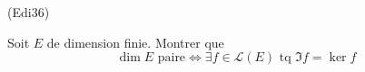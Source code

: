 \begin{tiny}(Edi36)\end{tiny} Soit $E$ de dimension finie. Montrer que
\begin{displaymath}
\dim E \text{ paire}
\Leftrightarrow \exists f\in \mathcal{L}(E) \text{ tq } \Im f = \ker f
\end{displaymath}
